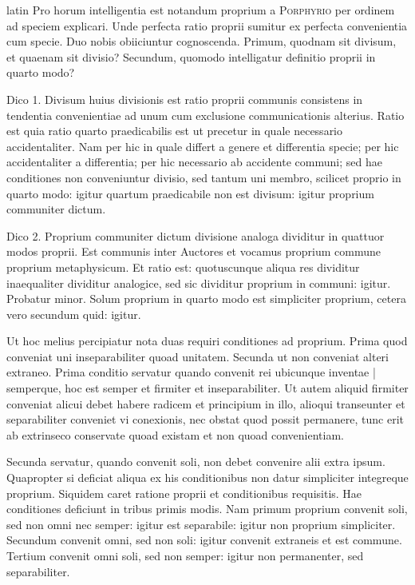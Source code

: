 \begin{otherlanguage*}{latin}
\pstart
  Pro horum intelligentia est notandum proprium a \textsc{Porphyrio} per ordinem ad speciem explicari. Unde perfecta ratio proprii sumitur ex perfecta convenientia cum specie. Duo nobis obiiciuntur cognoscenda. Primum, quodnam sit divisum, et quaenam sit divisio? Secundum, quomodo intelligatur definitio proprii in quarto modo? 
\pend

\pstart
  Dico 1. Divisum huius divisionis est ratio proprii communis consistens in tendentia convenientiae ad unum cum exclusione communicationis alterius. Ratio est quia ratio quarto praedicabilis est ut precetur in quale necessario accidentaliter. Nam per hic in quale differt a genere et differentia specie; per hic accidentaliter a differentia; per hic necessario ab accidente communi; sed hae conditiones non conveniuntur divisio, sed tantum uni membro, scilicet proprio in quarto modo: igitur quartum praedicabile non est divisum: igitur proprium communiter dictum. 
\pend

\pstart
  Dico 2. Proprium communiter dictum divisione analoga dividitur in quattuor modos proprii. Est communis inter Auctores et vocamus proprium commune proprium metaphysicum. Et ratio est: quotuscunque aliqua res dividitur inaequaliter dividitur analogice, sed sic dividitur proprium in communi: igitur. Probatur minor. Solum proprium in quarto modo est simpliciter proprium, cetera vero secundum quid: igitur. 
\pend

\pstart
  Ut hoc melius percipiatur nota duas requiri conditiones ad proprium. Prima quod conveniat uni inseparabiliter quoad unitatem. Secunda ut non conveniat alteri extraneo. Prima conditio servatur quando convenit rei ubicunque inventae \textnormal{|}   semperque, hoc est semper et firmiter et inseparabiliter. Ut autem aliquid firmiter conveniat alicui debet habere radicem et principium in illo, alioqui transeunter et separabiliter conveniet vi conexionis, nec obstat quod possit permanere, tunc erit ab extrinseco conservate quoad existam et non quoad convenientiam. 
\pend

\pstart
  Secunda servatur, quando convenit soli, non debet convenire alii extra ipsum. Quapropter si deficiat aliqua ex his conditionibus non datur simpliciter integreque proprium. Siquidem caret ratione proprii et conditionibus requisitis. Hae conditiones deficiunt in tribus primis modis. Nam primum proprium convenit soli, sed non omni nec semper: igitur est separabile: igitur non proprium simpliciter. Secundum convenit omni, sed non soli: igitur convenit extraneis et est commune. Tertium convenit omni soli, sed non semper: igitur non permanenter, sed separabiliter. 
\pend


\end{otherlanguage*}
